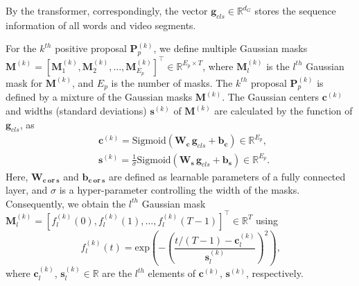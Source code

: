 By the transformer, correspondingly, the vector $\mathbf{g}_{cls}\in \mathbb{R}^{d_G}$ stores the sequence information of all words and video segments.

For the $k^{th}$ positive proposal $\mathbf{P}_{p}^{(k)}$, we define multiple Gaussian masks $\mathbf{M}^{(k)} = [\mathbf{M}_{1}^{(k)},\mathbf{M}_{2}^{(k)},\dots,\mathbf{M}_{E_p}^{(k)}]^\top \in \mathbb{R}^{E_p\times T}$, where $\mathbf{M}_{l}^{(k)}$ is the $l^{th}$ Gaussian mask for $\mathbf{M}^{(k)}$, and $E_p$ is the number of masks.
The $k^{th}$ proposal $\mathbf{P}_{p}^{(k)}$ is defined by a mixture of the Gaussian masks $\mathbf{M}^{(k)}$.
The Gaussian centers $\mathbf{c}^{(k)}$ and widths (standard deviations) $\mathbf{s}^{(k)}$ of $\mathbf{M}^{(k)}$ are calculated by the function of $\mathbf{g}_{cls}$, as
\begin{align}
  &\mathbf{c}^{(k)} = \textrm{Sigmoid}\left(\mathbf{W}_\mathbf{c}\,\mathbf{g}_{cls}+\mathbf{b}_\mathbf{c}\right) \in \mathbb{R}^{E_p} \text{,} 
  \label{eq:mask-center}\\
  &\mathbf{s}^{(k)} = \frac{1}{\sigma}\textrm{Sigmoid}\left(\mathbf{W}_\mathbf{s}\,\mathbf{g}_{cls}+\mathbf{b}_\mathbf{s}\right) \in \mathbb{R}^{E_p} \text{.}
  \label{eq:mask-width}
\end{align}
Here, $\mathbf{W}_\mathbf{c~or~s}$ and $\mathbf{b}_\mathbf{c~or~s}$ are defined as  learnable parameters of a fully connected layer, and $\sigma$ is a hyper-parameter controlling the width of the masks.
Consequently, we obtain the $l^{th}$ Gaussian mask $\mathbf{M}_{l}^{(k)} = [f_{l}^{(k)}(0), f_{l}^{(k)}(1), \dots, f_{l}^{(k)}(T-1)]^\top \in \mathbb{R}^{T}$ using 
\begin{equation}
  f_{l}^{(k)}(t) = \mathrm{exp}\left(-\left(\frac{t/(T-1)-\mathbf{c}^{(k)}_{l}}{\mathbf{s}^{(k)}_{l}}\right)^2\right) \text{,} 
  \label{eq:gaussian}
\end{equation}
where $\mathbf{c}^{(k)}_{l}$, $\mathbf{s}^{(k)}_{l} \in \mathbb{R}$ are the $l^{th}$  elements of $\mathbf{c}^{(k)}$, $\mathbf{s}^{(k)}$, respectively.

